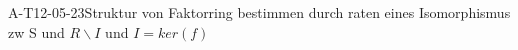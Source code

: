 
\begin{REM}{A-T12-05-23}{Struktur von Faktorring bestimmen durch raten eines Isomorphismus zw S und $R\backslash I$ und $I=ker(f)$}
\end{REM}

